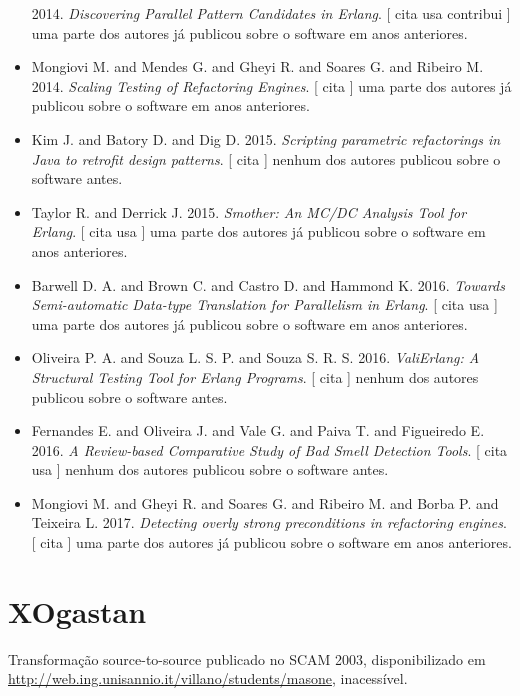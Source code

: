 \begin{itemize}
      2014.
        \textit{ Discovering Parallel Pattern Candidates in Erlang}.
      [
          cita
          usa
          contribui
      ]
uma parte dos autores já publicou sobre o software em anos anteriores.
\item Mongiovi M. and Mendes G. and Gheyi R. and Soares G. and Ribeiro M.
      2014.
        \textit{ Scaling Testing of Refactoring Engines}.
      [
          cita
      ]
uma parte dos autores já publicou sobre o software em anos anteriores.
\item Kim J. and Batory D. and Dig D.
      2015.
        \textit{ Scripting parametric refactorings in Java to retrofit design patterns}.
      [
          cita
      ]
nenhum dos autores publicou sobre o software antes.
\item Taylor R. and Derrick J.
      2015.
        \textit{ Smother: An MC/DC Analysis Tool for Erlang}.
      [
          cita
          usa
      ]
uma parte dos autores já publicou sobre o software em anos anteriores.
\item Barwell D. A. and Brown C. and Castro D. and Hammond K.
      2016.
        \textit{ Towards Semi-automatic Data-type Translation for Parallelism in Erlang}.
      [
          cita
          usa
      ]
uma parte dos autores já publicou sobre o software em anos anteriores.
\item Oliveira P. A. and Souza L. S. P. and Souza S. R. S.
      2016.
        \textit{ ValiErlang: A Structural Testing Tool for Erlang Programs}.
      [
          cita
      ]
nenhum dos autores publicou sobre o software antes.
\item Fernandes E. and Oliveira J. and Vale G. and Paiva T. and Figueiredo E.
      2016.
        \textit{ A Review-based Comparative Study of Bad Smell Detection Tools}.
      [
          cita
          usa
      ]
nenhum dos autores publicou sobre o software antes.
\item Mongiovi M. and Gheyi R. and Soares G. and Ribeiro M. and Borba P. and Teixeira L.
      2017.
        \textit{ Detecting overly strong preconditions in refactoring engines}.
      [
          cita
      ]
uma parte dos autores já publicou sobre o software em anos anteriores.
\end{itemize}
\section{XOgastan}

Transformação source-to-source
publicado no SCAM 2003,
disponibilizado em \url{http://web.ing.unisannio.it/villano/students/masone},
inacessível.

